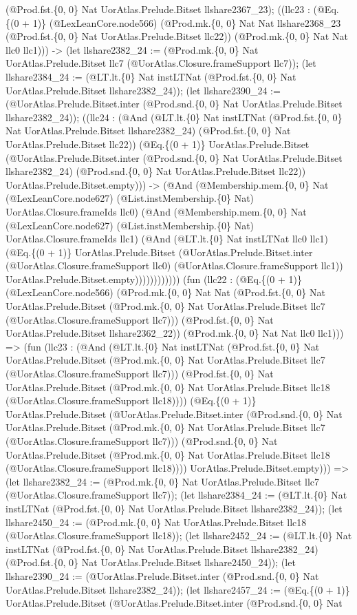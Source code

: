 \documentclass[11pt]{article}
\begin{document}
(@Prod.fst.\{0, 0\} Nat UorAtlas.Prelude.Bitset llshare2367\_23); ((llc23 : (@Eq.\{(0 + 1)\} (@LexLeanCore.node566) (@Prod.mk.\{0, 0\} Nat Nat llshare2368\_23 (@Prod.fst.\{0, 0\} Nat UorAtlas.Prelude.Bitset llc22)) (@Prod.mk.\{0, 0\} Nat Nat llc0 llc1))) -> (let llshare2382\_24 := (@Prod.mk.\{0, 0\} Nat UorAtlas.Prelude.Bitset llc7 (@UorAtlas.Closure.frameSupport llc7)); (let llshare2384\_24 := (@LT.lt.\{0\} Nat instLTNat (@Prod.fst.\{0, 0\} Nat UorAtlas.Prelude.Bitset llshare2382\_24)); (let llshare2390\_24 := (@UorAtlas.Prelude.Bitset.inter (@Prod.snd.\{0, 0\} Nat UorAtlas.Prelude.Bitset llshare2382\_24)); ((llc24 : (@And (@LT.lt.\{0\} Nat instLTNat (@Prod.fst.\{0, 0\} Nat UorAtlas.Prelude.Bitset llshare2382\_24) (@Prod.fst.\{0, 0\} Nat UorAtlas.Prelude.Bitset llc22)) (@Eq.\{(0 + 1)\} UorAtlas.Prelude.Bitset (@UorAtlas.Prelude.Bitset.inter (@Prod.snd.\{0, 0\} Nat UorAtlas.Prelude.Bitset llshare2382\_24) (@Prod.snd.\{0, 0\} Nat UorAtlas.Prelude.Bitset llc22)) UorAtlas.Prelude.Bitset.empty))) -> (@And (@Membership.mem.\{0, 0\} Nat (@LexLeanCore.node627) (@List.instMembership.\{0\} Nat) UorAtlas.Closure.frameIds llc0) (@And (@Membership.mem.\{0, 0\} Nat (@LexLeanCore.node627) (@List.instMembership.\{0\} Nat) UorAtlas.Closure.frameIds llc1) (@And (@LT.lt.\{0\} Nat instLTNat llc0 llc1) (@Eq.\{(0 + 1)\} UorAtlas.Prelude.Bitset (@UorAtlas.Prelude.Bitset.inter (@UorAtlas.Closure.frameSupport llc0) (@UorAtlas.Closure.frameSupport llc1)) UorAtlas.Prelude.Bitset.empty)))))))))))) (fun (llc22 : (@Eq.\{(0 + 1)\} (@LexLeanCore.node566) (@Prod.mk.\{0, 0\} Nat Nat (@Prod.fst.\{0, 0\} Nat UorAtlas.Prelude.Bitset (@Prod.mk.\{0, 0\} Nat UorAtlas.Prelude.Bitset llc7 (@UorAtlas.Closure.frameSupport llc7))) (@Prod.fst.\{0, 0\} Nat UorAtlas.Prelude.Bitset llshare2362\_22)) (@Prod.mk.\{0, 0\} Nat Nat llc0 llc1))) => (fun (llc23 : (@And (@LT.lt.\{0\} Nat instLTNat (@Prod.fst.\{0, 0\} Nat UorAtlas.Prelude.Bitset (@Prod.mk.\{0, 0\} Nat UorAtlas.Prelude.Bitset llc7 (@UorAtlas.Closure.frameSupport llc7))) (@Prod.fst.\{0, 0\} Nat UorAtlas.Prelude.Bitset (@Prod.mk.\{0, 0\} Nat UorAtlas.Prelude.Bitset llc18 (@UorAtlas.Closure.frameSupport llc18)))) (@Eq.\{(0 + 1)\} UorAtlas.Prelude.Bitset (@UorAtlas.Prelude.Bitset.inter (@Prod.snd.\{0, 0\} Nat UorAtlas.Prelude.Bitset (@Prod.mk.\{0, 0\} Nat UorAtlas.Prelude.Bitset llc7 (@UorAtlas.Closure.frameSupport llc7))) (@Prod.snd.\{0, 0\} Nat UorAtlas.Prelude.Bitset (@Prod.mk.\{0, 0\} Nat UorAtlas.Prelude.Bitset llc18 (@UorAtlas.Closure.frameSupport llc18)))) UorAtlas.Prelude.Bitset.empty))) => (let llshare2382\_24 := (@Prod.mk.\{0, 0\} Nat UorAtlas.Prelude.Bitset llc7 (@UorAtlas.Closure.frameSupport llc7)); (let llshare2384\_24 := (@LT.lt.\{0\} Nat instLTNat (@Prod.fst.\{0, 0\} Nat UorAtlas.Prelude.Bitset llshare2382\_24)); (let llshare2450\_24 := (@Prod.mk.\{0, 0\} Nat UorAtlas.Prelude.Bitset llc18 (@UorAtlas.Closure.frameSupport llc18)); (let llshare2452\_24 := (@LT.lt.\{0\} Nat instLTNat (@Prod.fst.\{0, 0\} Nat UorAtlas.Prelude.Bitset llshare2382\_24) (@Prod.fst.\{0, 0\} Nat UorAtlas.Prelude.Bitset llshare2450\_24)); (let llshare2390\_24 := (@UorAtlas.Prelude.Bitset.inter (@Prod.snd.\{0, 0\} Nat UorAtlas.Prelude.Bitset llshare2382\_24)); (let llshare2457\_24 := (@Eq.\{(0 + 1)\} UorAtlas.Prelude.Bitset (@UorAtlas.Prelude.Bitset.inter (@Prod.snd.\{0, 0\} Nat 
\end{document}
